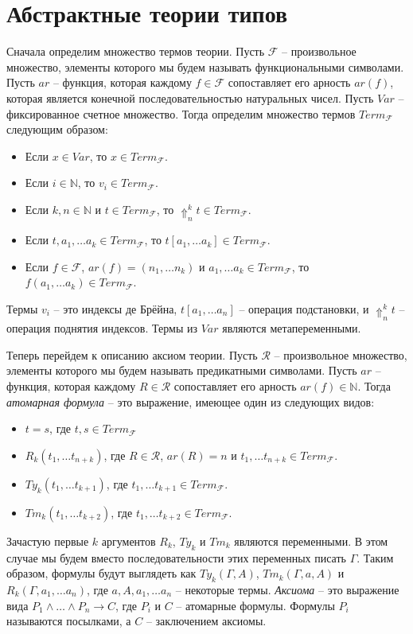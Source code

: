 \documentclass{amsart}
\theoremstyle{definition}
\theoremstyle{remark}
\numberwithin{figure}{section}
\begin{document}
\section{Абстрактные теории типов}

Сначала определим множество термов теории.
Пусть $\mathcal{F}$ -- произвольное множество, элементы которого мы будем называть функциональными символами.
Пусть $ar$ -- функция, которая каждому $f \in \mathcal{F}$ сопоставляет его арность $ar(f)$, которая является конечной последовательностью натуральных чисел.
Пусть $Var$ -- фиксированное счетное множество.
Тогда определим множество термов $Term_\mathcal{F}$ следующим образом:
\begin{itemize}
\item Если $x \in Var$, то $x \in Term_\mathcal{F}$.
\item Если $i \in \mathbb{N}$, то $v_i \in Term_\mathcal{F}$.
\item Если $k,n \in \mathbb{N}$ и $t \in Term_\mathcal{F}$, то $\Uparrow^k_n t \in Term_\mathcal{F}$.
\item Если $t, a_1, \ldots a_k \in Term_\mathcal{F}$, то $t[a_1, \ldots a_k] \in Term_\mathcal{F}$.
\item Если $f \in \mathcal{F}$, $ar(f) = (n_1, \ldots n_k)$ и $a_1, \ldots a_k \in Term_\mathcal{F}$, то $f(a_1, \ldots a_k) \in Term_\mathcal{F}$.
\end{itemize}
Термы $v_i$ -- это индексы де Брёйна, $t[a_1, \ldots a_n]$ -- операция подстановки, и $\Uparrow^k_n t$ -- операция поднятия индексов.
Термы из $Var$ являются метапеременными.

Теперь перейдем к описанию аксиом теории.
Пусть $\mathcal{R}$ -- произвольное множество, элементы которого мы будем называть предикатными символами.
Пусть $ar$ -- функция, которая каждому $R \in \mathcal{R}$ сопоставляет его арность $ar(f) \in \mathbb{N}$.
Тогда \emph{атомарная формула} -- это выражение, имеющее один из следующих видов:
\begin{itemize}
\item $t = s$, где $t, s \in Term_\mathcal{F}$
\item $R_k(t_1, \ldots t_{n+k})$, где $R \in \mathcal{R}$, $ar(R) = n$ и $t_1, \ldots t_{n+k} \in Term_\mathcal{F}$.
\item $Ty_k(t_1, \ldots t_{k+1})$, где $t_1, \ldots t_{k+1} \in Term_\mathcal{F}$.
\item $Tm_k(t_1, \ldots t_{k+2})$, где $t_1, \ldots t_{k+2} \in Term_\mathcal{F}$.
\end{itemize}
Зачастую первые $k$ аргументов $R_k$, $Ty_k$ и $Tm_k$ являются переменными.
В этом случае мы будем вместо последовательности этих переменных писать $\Gamma$.
Таким образом, формулы будут выглядеть как $Ty_k(\Gamma, A)$, $Tm_k(\Gamma, a, A)$ и $R_k(\Gamma, a_1, \ldots a_n)$, где $a, A, a_1, \ldots a_n$ -- некоторые термы.
\emph{Аксиома} -- это выражение вида $P_1 \land \ldots \land P_n \to C$, где $P_i$ и $C$ -- атомарные формулы.
Формулы $P_i$ называются посылками, а $C$ -- заключением аксиомы.
\end{document}
